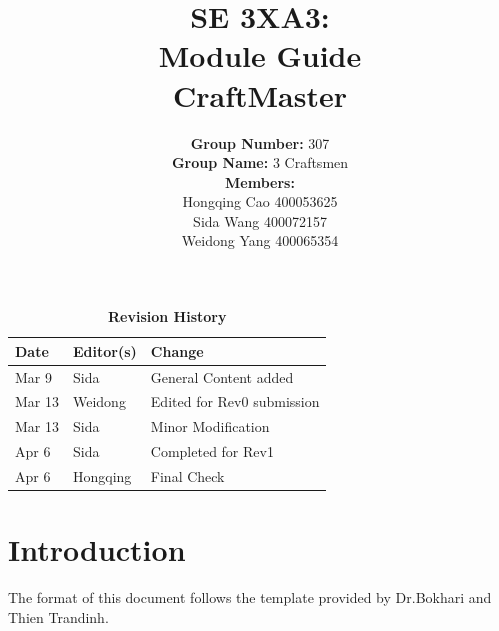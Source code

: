 \documentclass[12pt, titlepage]{article}
\begin{document}
\title{\textbf{SE 3XA3: \\Module Guide\\CraftMaster}}

\author{\textbf{Group Number: }307\\
		\textbf{Group Name: }3 Craftsmen \\
		\textbf{Members: }\\
		Hongqing Cao 400053625\\
		Sida Wang	 400072157\\
		Weidong Yang 400065354}

\date{}

\maketitle
\newpage

\tableofcontents
\listoftables
\listoffigures
\newpage

\begin{table}[!htbp]
\begin{tabularx}{\textwidth}{llX}
\toprule
\textbf{Date} & \textbf{Editor(s)} & \textbf{Change}\\
\midrule
Mar 9 & Sida & General Content added\\
Mar 13 & Weidong & Edited for Rev0 submission\\
Mar 13 & Sida & Minor Modification\\
Apr 6 & Sida & Completed for Rev1\\
Apr 6 & Hongqing & Final Check\\
\bottomrule
\end{tabularx}
\caption{\textbf{Revision History}} \label{TblRevisionHistory}
\end{table}


\newpage


\section{Introduction}
The format of this document follows the template provided by Dr.Bokhari and Thien Trandinh.
\end{document}
